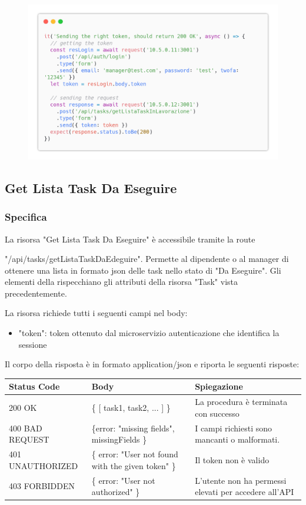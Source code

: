 \documentclass{report}
\begin{document}
\begin{figure}[H]
	\centering\includegraphics[width=1\textwidth]{images/code_in_lavorazione_test4.png}
\end{figure}

\subsection{Get Lista Task Da Eseguire}
\subsubsection*{Specifica}

La risorsa "Get Lista Task Da Eseguire" è accessibile tramite la route

"/api/tasks/getListaTaskDaEdeguire". Permette al dipendente o al manager di ottenere una lista in formato json delle task nello stato di "Da Eseguire". Gli elementi della rispecchiano gli attributi della risorsa "Task" vista precedentemente.

La risorsa richiede tutti i seguenti campi nel body:
\begin{itemize}
	\item "token": token ottenuto dal microservizio autenticazione che identifica la sessione
\end{itemize}

Il corpo della risposta è in formato application/json e riporta le seguenti risposte:

\begin{center} %
	\centering
	\begin{tabular}{ |p{4cm}|p{4cm}|p{4cm}| }
		\hline
		\centering Status Code & \qquad\qquad\quad Body & \qquad\quad Spiegazione\\ %
		\hline
		200 OK & \{ [ task1, task2, ... ] \}  & La procedura è terminata con successo	\\ 
		\hline
		400 BAD REQUEST & \{error: "missing fields", missingFields \} & I campi richiesti sono mancanti o malformati. \\
		\hline
		401 UNAUTHORIZED & \{ error: "User not found with the given token" \} & Il token non è valido \\
		\hline
		403 FORBIDDEN & \{ error: "User not authorized" \} &  L'utente non ha permessi elevati per accedere all'API \\
		\hline
	\end{tabular}
\end{center}
\end{document}

